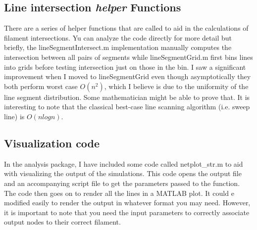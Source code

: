 \subsection{Line intersection \textit{helper} Functions}
There are a series of helper functions that are called to aid in the calculations of filament intersections.  Yu can analyze the code directly for more detail but briefly, the lineSegmentIntersect.m implementation manually computes the intersection between all pairs of segments while lineSegmentGrid.m first bins lines into grids before testing intersection just on those in the bin.  I saw a significant improvement when I moved to lineSegmentGrid even though asymptotically they both perform worst case $O(n^2)$, which I believe is due to the uniformity of the line segment distribution.  Some mathematician might be able to prove that.  It is interesting to note that the classical best-case line scanning algorithm (i.e. sweep line) is $O(nlogn)$.

\subsection{Visualization code}
In the analysis package, I have included some code called netplot\_str.m to aid with visualizing the output of the simulations.  This code opens the output file and an accompanying script file to get the parameters passed to the function.  The code then goes on to render all the lines in a MATLAB plot.  It could e modified easily to render the output in whatever format you may need.  However, it is important to note that you need the input parameters to correctly associate output nodes to their correct filament.